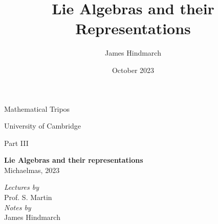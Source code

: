 \documentclass{article}
\title{Lie Algebras and their Representations}
\author{James Hindmarch}
\date{October 2023}
\begin{document}
\begin{titlepage}
    \begin{center}
        \vspace*{1cm}
            
        \Huge
        Mathematical Tripos
            
        \vspace{0.5cm}
        \LARGE
        University of Cambridge
            
        \vspace{1.5cm}
        
        \Large
        Part III 
        \LARGE 

        \textbf{Lie Algebras and their representations}\\
        \vspace{1.5cm}
        Michaelmas, 2023
            
        \vspace{2cm}
        \Large \textit{Lectures by}\\
        \Large Prof. S. Martin\\

        \vspace{3cm}
        \large
        \textit{Notes by}\\
            James Hindmarch\\ \vspace{1.4cm}
    \end{center}

\end{titlepage}
\tableofcontents
\end{document}
